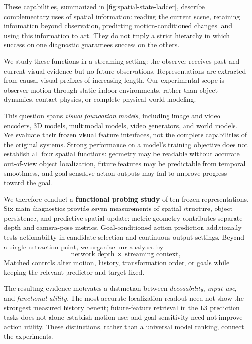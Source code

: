 \documentclass{article} %
\begin{document}
These capabilities, summarized in \cref{fig:spatial-state-ladder}, describe
complementary uses of spatial information: reading the current scene,
retaining information beyond observation, predicting motion-conditioned
changes, and using this information to act. They do not imply a strict
hierarchy in which success on one diagnostic guarantees success on the others.

We study these functions in a streaming setting: the observer receives past
and current visual evidence but no future observations. Representations are
extracted from causal visual prefixes of increasing length. Our experimental
scope is observer motion through static indoor environments, rather than
object dynamics, contact physics, or complete physical world modeling.

This question spans \emph{visual foundation models}, including image and
video encoders, 3D models, multimodal models, video generators, and world
models. We evaluate their frozen visual feature interfaces, not the complete
capabilities of the original systems. Strong performance on a model's
training objective does not establish all four spatial functions: geometry
may be readable without accurate out-of-view object localization, future features
may be predictable from temporal smoothness, and goal-sensitive action
outputs may fail to improve progress toward the goal.

We therefore conduct a \textbf{functional probing study} of ten frozen
representations. Six main diagnostics provide seven measurements of spatial
structure, object persistence, and predictive spatial update: metric geometry
contributes separate depth and camera-pose metrics. Goal-conditioned action
prediction additionally tests actionability in candidate-selection and
continuous-output settings. Beyond a single extraction point, we organize our analyses by
\begin{equation}
  \text{network depth}\ \times\
  \text{streaming context},
\end{equation}
Matched controls alter motion, history, transformation order, or goals while
keeping the relevant predictor and target fixed.

The resulting evidence motivates a distinction between \emph{decodability},
\emph{input use}, and \emph{functional utility}. The most accurate localization
readout need not show the strongest measured history benefit; future-feature
retrieval in the L3 prediction tasks does not alone establish motion use; and
goal sensitivity need not
improve action utility. These distinctions, rather than a universal model
ranking, connect the experiments.
\end{document}
